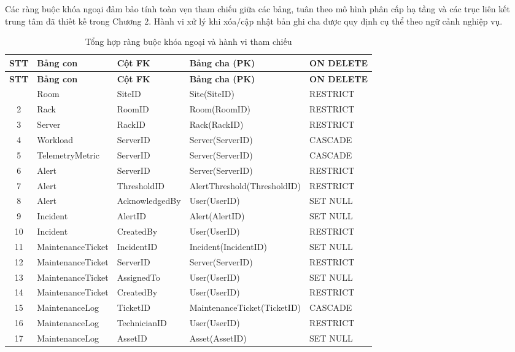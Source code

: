 Các ràng buộc khóa ngoại đảm bảo tính toàn vẹn tham chiếu giữa các bảng, tuân theo mô hình phân cấp hạ tầng và các trục liên kết trung tâm đã thiết kế trong Chương 2. Hành vi xử lý khi xóa/cập nhật bản ghi cha được quy định cụ thể theo ngữ cảnh nghiệp vụ.

\begin{longtable}{|c|l|l|l|l|}
\caption{Tổng hợp ràng buộc khóa ngoại và hành vi tham chiếu} \label{tab:fk_constraints} \\
\hline
\textbf{STT} & \textbf{Bảng con} & \textbf{Cột FK} & \textbf{Bảng cha (PK)} & \textbf{ON DELETE} \\ \hline
\endfirsthead
\hline
\textbf{STT} & \textbf{Bảng con} & \textbf{Cột FK} & \textbf{Bảng cha (PK)} & \textbf{ON DELETE} \\ \hline
\endhead
\hline
\endfoot
1 & Room & SiteID & Site(SiteID) & RESTRICT \\ \hline
2 & Rack & RoomID & Room(RoomID) & RESTRICT \\ \hline
3 & Server & RackID & Rack(RackID) & RESTRICT \\ \hline
4 & Workload & ServerID & Server(ServerID) & CASCADE \\ \hline
5 & TelemetryMetric & ServerID & Server(ServerID) & CASCADE \\ \hline
6 & Alert & ServerID & Server(ServerID) & RESTRICT \\ \hline
7 & Alert & ThresholdID & AlertThreshold(ThresholdID) & RESTRICT \\ \hline
8 & Alert & AcknowledgedBy & User(UserID) & SET NULL \\ \hline
9 & Incident & AlertID & Alert(AlertID) & SET NULL \\ \hline
10 & Incident & CreatedBy & User(UserID) & RESTRICT \\ \hline
11 & MaintenanceTicket & IncidentID & Incident(IncidentID) & SET NULL \\ \hline
12 & MaintenanceTicket & ServerID & Server(ServerID) & RESTRICT \\ \hline
13 & MaintenanceTicket & AssignedTo & User(UserID) & SET NULL \\ \hline
14 & MaintenanceTicket & CreatedBy & User(UserID) & RESTRICT \\ \hline
15 & MaintenanceLog & TicketID & MaintenanceTicket(TicketID) & CASCADE \\ \hline
16 & MaintenanceLog & TechnicianID & User(UserID) & RESTRICT \\ \hline
17 & MaintenanceLog & AssetID & Asset(AssetID) & SET NULL \\ \hline

\end{longtable}
